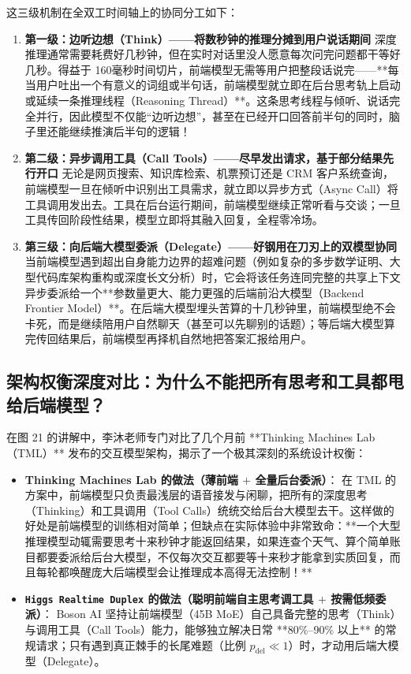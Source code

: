 \documentclass[a4paper]{article}
\begin{document}
这三级机制在全双工时间轴上的协同分工如下：
\begin{enumerate}
    \item \textbf{第一级：边听边想（Think）——将数秒钟的推理分摊到用户说话期间}
    深度推理通常需要耗费好几秒钟，但在实时对话里没人愿意每次问完问题都干等好几秒。得益于 160毫秒时间切片，前端模型无需等用户把整段话说完——**每当用户吐出一个有意义的词组或半句话，前端模型就立即在后台思考轨上启动或延续一条推理线程（Reasoning Thread）**。这条思考线程与倾听、说话完全并行，因此模型不仅能“边听边想”，甚至在已经开口回答前半句的同时，脑子里还能继续推演后半句的逻辑！
    \item \textbf{第二级：异步调用工具（Call Tools）——尽早发出请求，基于部分结果先行开口}
    无论是网页搜索、知识库检索、机票预订还是 CRM 客户系统查询，前端模型一旦在倾听中识别出工具需求，就立即以异步方式（Async Call）将工具调用发出去。工具在后台运行期间，前端模型继续正常听看与交谈；一旦工具传回阶段性结果，模型立即将其融入回复，全程零冷场。
    \item \textbf{第三级：向后端大模型委派（Delegate）——好钢用在刀刃上的双模型协同}
    当前端模型遇到超出自身能力边界的超难问题（例如复杂的多步数学证明、大型代码库架构重构或深度长文分析）时，它会将该任务连同完整的共享上下文异步委派给一个**参数量更大、能力更强的后端前沿大模型（Backend Frontier Model）**。在后端大模型埋头苦算的十几秒钟里，前端模型绝不会卡死，而是继续陪用户自然聊天（甚至可以先聊别的话题）；等后端大模型算完传回结果后，前端模型再择机自然地把答案汇报给用户。
\end{enumerate}

\subsection{架构权衡深度对比：为什么不能把所有思考和工具都甩给后端模型？}

在图 21 的讲解中，李沐老师专门对比了几个月前 **Thinking Machines Lab（TML）** 发布的交互模型架构，揭示了一个极其深刻的系统设计权衡：
\begin{itemize}
    \item \textbf{Thinking Machines Lab 的做法（薄前端 $+$ 全量后台委派）}：
    在 TML 的方案中，前端模型只负责最浅层的语音接发与闲聊，把所有的深度思考（Thinking）和工具调用（Tool Calls）统统交给后台大模型去干。这样做的好处是前端模型的训练相对简单；但缺点在实际体验中非常致命：**一个大型推理模型动辄需要思考十来秒钟才能返回结果，如果连查个天气、算个简单账目都要委派给后台大模型，不仅每次交互都要等十来秒才能拿到实质回复，而且每轮都唤醒庞大后端模型会让推理成本高得无法控制！**
    \item \textbf{\texttt{Higgs Realtime Duplex} 的做法（聪明前端自主思考调工具 $+$ 按需低频委派）}：
    Boson AI 坚持让前端模型（45B MoE）自己具备完整的思考（Think）与调用工具（Call Tools）能力，能够独立解决日常 **80\%–90\% 以上** 的常规请求；只有遇到真正棘手的长尾难题（比例 $p_{\mathrm{del}} \ll 1$）时，才动用后端大模型（Delegate）。
\end{itemize}
\end{document}
